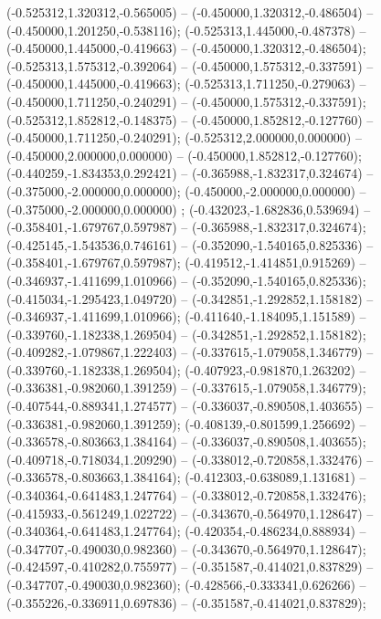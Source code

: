  (-0.525312,1.320312,-0.565005) -- (-0.450000,1.320312,-0.486504) -- (-0.450000,1.201250,-0.538116);
 (-0.525313,1.445000,-0.487378) -- (-0.450000,1.445000,-0.419663) -- (-0.450000,1.320312,-0.486504);
 (-0.525313,1.575312,-0.392064) -- (-0.450000,1.575312,-0.337591) -- (-0.450000,1.445000,-0.419663);
 (-0.525313,1.711250,-0.279063) -- (-0.450000,1.711250,-0.240291) -- (-0.450000,1.575312,-0.337591);
 (-0.525312,1.852812,-0.148375) -- (-0.450000,1.852812,-0.127760) -- (-0.450000,1.711250,-0.240291);
 (-0.525312,2.000000,0.000000) -- (-0.450000,2.000000,0.000000) -- (-0.450000,1.852812,-0.127760);
 (-0.440259,-1.834353,0.292421) -- (-0.365988,-1.832317,0.324674) -- (-0.375000,-2.000000,0.000000);
 (-0.450000,-2.000000,0.000000) -- (-0.375000,-2.000000,0.000000) ;
 (-0.432023,-1.682836,0.539694) -- (-0.358401,-1.679767,0.597987) -- (-0.365988,-1.832317,0.324674);
 (-0.425145,-1.543536,0.746161) -- (-0.352090,-1.540165,0.825336) -- (-0.358401,-1.679767,0.597987);
 (-0.419512,-1.414851,0.915269) -- (-0.346937,-1.411699,1.010966) -- (-0.352090,-1.540165,0.825336);
 (-0.415034,-1.295423,1.049720) -- (-0.342851,-1.292852,1.158182) -- (-0.346937,-1.411699,1.010966);
 (-0.411640,-1.184095,1.151589) -- (-0.339760,-1.182338,1.269504) -- (-0.342851,-1.292852,1.158182);
 (-0.409282,-1.079867,1.222403) -- (-0.337615,-1.079058,1.346779) -- (-0.339760,-1.182338,1.269504);
 (-0.407923,-0.981870,1.263202) -- (-0.336381,-0.982060,1.391259) -- (-0.337615,-1.079058,1.346779);
 (-0.407544,-0.889341,1.274577) -- (-0.336037,-0.890508,1.403655) -- (-0.336381,-0.982060,1.391259);
 (-0.408139,-0.801599,1.256692) -- (-0.336578,-0.803663,1.384164) -- (-0.336037,-0.890508,1.403655);
 (-0.409718,-0.718034,1.209290) -- (-0.338012,-0.720858,1.332476) -- (-0.336578,-0.803663,1.384164);
 (-0.412303,-0.638089,1.131681) -- (-0.340364,-0.641483,1.247764) -- (-0.338012,-0.720858,1.332476);
 (-0.415933,-0.561249,1.022722) -- (-0.343670,-0.564970,1.128647) -- (-0.340364,-0.641483,1.247764);
 (-0.420354,-0.486234,0.888934) -- (-0.347707,-0.490030,0.982360) -- (-0.343670,-0.564970,1.128647);
 (-0.424597,-0.410282,0.755977) -- (-0.351587,-0.414021,0.837829) -- (-0.347707,-0.490030,0.982360);
 (-0.428566,-0.333341,0.626266) -- (-0.355226,-0.336911,0.697836) -- (-0.351587,-0.414021,0.837829);

